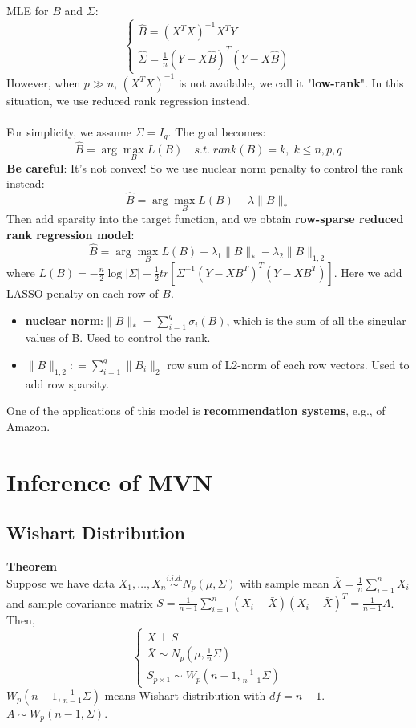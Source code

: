 \documentclass[12pt]{book}
\theoremstyle{definition}
\theoremstyle{remark}
\begin{document}
MLE for $B$ and $\Sigma$:\\
\[\begin{cases}
    \hat{B} = (X^TX)^{-1}X^TY\\
    \hat{\Sigma} = \frac{1}{n}(Y - X\hat{B})^T(Y - X\hat{B})
\end{cases}\]
However, when $p\gg n$, $(X^TX)^{-1}$ is not available, we call it "\textbf{low-rank}". In this situation, we use reduced rank regression instead.\\
\\
For simplicity, we assume $\Sigma = I_q$. The goal becomes:
\[\hat{B} = \arg\underset{B}{\max}L(B) \quad s.t.\; rank(B) = k,\; k\le n,p,q\]
\textbf{Be careful}: It's not convex! So we use nuclear norm penalty to control the rank instead:
\[\hat{B} = \arg\underset{B}{\max}L(B) - \lambda\|B\|_*\]
Then add sparsity into the target function, and we obtain \textbf{row-sparse reduced rank regression model}:
\[\hat{B} = \arg\underset{B}{\max}L(B) - \lambda_1\|B\|_* - \lambda_2\|B\|_{1,2}\]
where $
L(B) = -\frac{n}{2} \log |\Sigma| - \frac{1}{2} tr \left[ \Sigma^{-1} (Y - X B^T)^T (Y - X B^T) \right]$. Here we add LASSO penalty on each row of $B$. 

\begin{notionbox}
    \begin{itemize}
        \item \textbf{nuclear norm}:$ \|B\|_*= \sum_{i=1}^q \sigma_i(B)$, which is the sum of all the singular values of B. Used to control the rank.
        \item $\|B\|_{1,2}: =\sum_{i=1}^q \|B_i\|_2$ row sum of L2-norm of each row vectors. Used to add row sparsity.
    \end{itemize}
\end{notionbox}

One of the applications of this model is \textbf{recommendation systems}, e.g., of Amazon.

\newpage{}
\section{Inference of MVN}
\subsection{Wishart Distribution}
\textbf{Theorem}\\
Suppose we have data $X_1, \dots, X_n \overset{i.i.d.}{\sim} N_p(\mu, \Sigma)$ with sample mean $\bar{X} = \frac{1}{n}\sum_{i=1}^n X_i$ and sample covariance matrix $S = \frac{1}{n-1}\sum_{i=1}^n(X_i-\bar{X})(X_i-\bar{X})^T = \frac{1}{n-1}A$. Then,
\[\begin{cases}
    \bar{X}\perp S\\
    \bar{X} \sim N_p(\mu, \frac{1}{n}\Sigma)\\
    S_{p\times 1}\sim W_p(n-1, \frac{1}{n-1}\Sigma)
\end{cases}\]
$W_p(n-1, \frac{1}{n-1}\Sigma)$ means Wishart distribution with $df = n-1$. $A\sim W_p(n-1, \Sigma)$.
\end{document}
